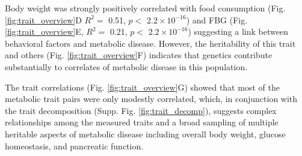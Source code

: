 \documentclass[
]{article}
\begin{document}
Body weight was strongly positively correlated with food consumption
(Fig. \ref{fig:trait_overview}D \(R^2 =\) 0.51, \(p<\)
\ensuremath{2.2\times 10^{-16}}) and FBG (Fig.
\ref{fig:trait_overview}E, \(R^2=\) 0.21, \(p <\)
\ensuremath{2.2\times 10^{-16}}) suggesting a link between behavioral
factors and metabolic disease. However, the heritability of this trait
and others (Fig. \ref{fig:trait_overview}F) indicates that genetics
contribute substantially to correlates of metabolic disease in this
population.

The trait correlations (Fig. \ref{fig:trait_overview}G) showed that most
of the metabolic trait pairs were only modestly correlated, which, in
conjunction with the trait decomposition (Supp. Fig.
\ref{fig:trait_decomp}), suggests complex relationships among the
measured traits and a broad sampling of multiple heritable aspects of
metabolic disease including overall body weight, glucose homeostasis,
and pancreatic function.
\end{document}
